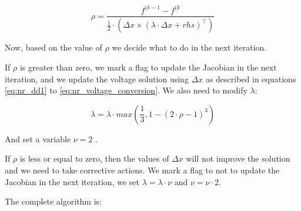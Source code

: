 \documentclass[nols,a4paper,twoside,notoc,fleqn]{tufte-book}
\begin{document}
\begin{equation}
\rho = \frac{f^{(k-1}-f^{(k}}{\frac{1}{2} \cdot (\Delta x \times (\lambda \cdot \Delta x + rhs)^\top)}
\label{eq:lm_rho}
\end{equation}

Now, based on the value of $\rho$ we decide what to do in the next iteration.

If $\rho$ is greater than zero, we mark a flag to update the Jacobian in the next iteration, and we update the voltage solution using $\Delta x$ as described in equations  \ref{eq:nr_dd1} to \ref{eq:nr_voltage_conversion}. We also need to modify $\lambda$:


\begin{equation}
\lambda = \lambda \cdot max(\frac{1}{3}, 1-(2\cdot \rho -1)^3)
\label{eq:lm_update_l}
\end{equation}

And set a variable $\nu=2$ .


If $\rho$ is less or equal to zero, then the values of $\Delta x$ will not improve the solution and we need to take corrective actions. We mark a flag to not to update the Jacobian in the next iteration, we set $\lambda=\lambda \cdot \nu$ and $\nu = \nu \cdot 2$.


The complete algorithm is: 
\end{document}
